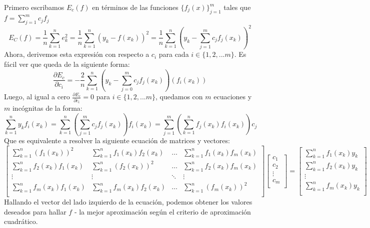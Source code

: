 Primero escribamos $E_c(f)$ en términos de las funciones $\{f_j(x)\}_{j=1}^m$ tales que $f=\sum_{j=1}^mc_jf_j$
$$E_C(f)=\frac{1}{n}\sum_{k=1}^ne_k^2=\frac{1}{n}\sum_{k=1}^n\left(y_k-f(x_k)\right)^2=\frac{1}{n}\sum_{k=1}^n\left(y_k-\sum_{j=1}^mc_jf_j(x_k)\right)^2$$
Ahora, derivemos esta expresión con respecto a $c_i$ para cada $i\in\{1,2,...m\}$. Es fácil ver que queda de la siguiente forma: 
$$\frac{\partial E_c}{\partial c_i}=-\frac{2}{n}\sum_{k=1}^n\left(y_k-\sum_{j=0}^mc_jf_j(x_k)\right)(f_i(x_k))$$
Luego, al igual a cero $\frac{\partial E_c}{\partial c_i}=0$ para $i\in\{1,2,...m\}$, quedamos con $m$ ecuaciones y $m$ incógnitas de la forma:
$$\sum_{k=1}^ny_kf_i(x_k)=\sum_{k=1}^n\left(\sum_{j=1}^mc_jf_j(x_k)\right)f_i(x_k)=\sum_{j=1}^m\left(\sum_{k=1}^nf_j(x_k)f_i(x_k)\right)c_j$$
Que es equivalente a resolver la siguiente ecuación de matrices y vectores:
$$
\begin{bmatrix}
    \sum_{k=1}^n(f_1(x_k))^2 & \sum_{k=1}^nf_1(x_k)f_2(x_k) & \dots & \sum_{k=1}^nf_1(x_k)f_m(x_k) \\
    \sum_{k=1}^nf_2(x_k)f_1(x_k) & \sum_{k=1}^n(f_2(x_k))^2 & \dots & \sum_{k=1}^nf_2(x_k)f_m(x_k) \\
    \vdots & \vdots & \ddots & \vdots\\
     \sum_{k=1}^nf_m(x_k)f_1(x_k) & \sum_{k=1}^nf_m(x_k)f_2(x_k) & \dots & \sum_{k=1}^n(f_m(x_k))^2 \\
\end{bmatrix}
\begin{bmatrix}
    c_1\\c_2\\\vdots\\c_m\\
\end{bmatrix}
=
\begin{bmatrix}
    \sum_{k=1}^n f_1(x_k)y_k\\\sum_{k=1}^n f_2(x_k)y_k\\\vdots\\\sum_{k=1}^n f_m(x_k)y_k\\
\end{bmatrix}
$$
Hallando el vector del lado izquierdo de la ecuación, podemos obtener los valores deseados para hallar $f$ -  la mejor aproximación según el criterio de aproximación cuadrático.



